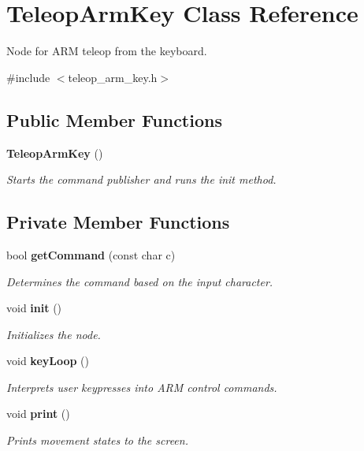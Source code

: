 \section{\-Teleop\-Arm\-Key \-Class \-Reference}
\label{classTeleopArmKey}


\-Node for \-A\-R\-M teleop from the keyboard.  




{\ttfamily \#include $<$teleop\-\_\-arm\-\_\-key.\-h$>$}

\subsection*{\-Public \-Member \-Functions}
\begin{DoxyCompactItemize}
\item 
{\bf \-Teleop\-Arm\-Key} ()
\begin{DoxyCompactList}\small\item\em \-Starts the command publisher and runs the init method. \end{DoxyCompactList}\end{DoxyCompactItemize}
\subsection*{\-Private \-Member \-Functions}
\begin{DoxyCompactItemize}
\item 
bool {\bf get\-Command} (const char c)
\begin{DoxyCompactList}\small\item\em \-Determines the command based on the input character. \end{DoxyCompactList}\item 
void {\bf init} ()
\begin{DoxyCompactList}\small\item\em \-Initializes the node. \end{DoxyCompactList}\item 
void {\bf key\-Loop} ()
\begin{DoxyCompactList}\small\item\em \-Interprets user keypresses into \-A\-R\-M control commands. \end{DoxyCompactList}\item 
void {\bf print} ()
\begin{DoxyCompactList}\small\item\em \-Prints movement states to the screen. \end{DoxyCompactList}\end{DoxyCompactItemize}
